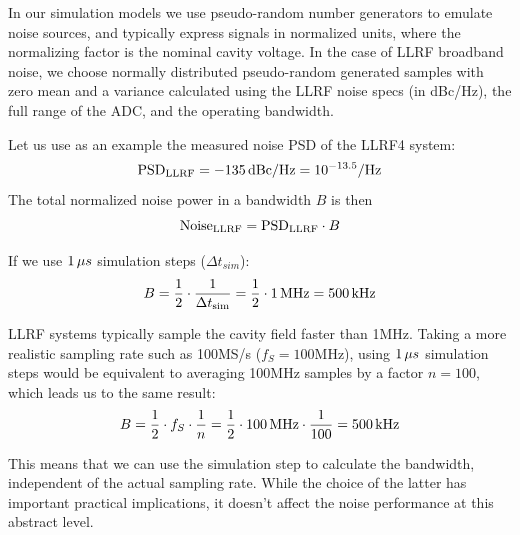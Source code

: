 \documentclass[a4paper,12pt]{article}
\begin{document}
In our simulation models we use pseudo-random number generators to emulate noise sources, and typically express signals in normalized units, where the normalizing factor is the nominal cavity voltage. In the case of LLRF broadband noise, we choose normally distributed pseudo-random generated samples with zero mean and a variance calculated using the LLRF noise specs (in dBc/Hz), the full range of the ADC, and the operating bandwidth.

Let us use as an example the measured noise PSD of the LLRF4 system:
\begin{equation}
  \centering {\rm PSD}_{\rm LLRF} = -135\thinspace{\rm dBc/Hz} = 10^{-13.5} {\rm /Hz}
\end{equation}
The total normalized noise power in a bandwidth $B$ is then
\begin{equation}
  \centering {\rm Noise}_{\rm LLRF} ={\rm PSD}_{\rm LLRF}\cdot B
  \label{eq:PSD_to_noise}
\end{equation}

\noindent If we use $1\thinspace\mu s$ simulation steps ($\Delta t_{sim}$):
\begin{equation}
  \centering B = \frac{1}{2} \cdot \frac{1}{\Delta t_{\rm sim}}=\frac{1}{2} \cdot 1\thinspace {\rm MHz} = 500\thinspace {\rm kHz}
\end{equation}

LLRF systems typically sample the cavity field faster than 1\thinspace MHz. Taking a more realistic sampling rate such as 100\thinspace MS/s ($f_S=100$\thinspace MHz), using $1\thinspace\mu s$ simulation steps would be equivalent to averaging 100\thinspace MHz samples by a factor $n=100$, which leads us to the same result:
\begin{equation}
  \centering B = \frac{1}{2} \cdot f_S \cdot \frac{1}{n} = \frac{1}{2} \cdot 100\thinspace{\rm MHz} \cdot \frac{1}{100} = 500\thinspace{\rm kHz}
\end{equation}

\noindent This means that we can use the simulation step to calculate the bandwidth, independent of the actual sampling rate.  While the choice of the latter has important practical implications, it doesn't affect the noise performance at this abstract level.
\end{document}
